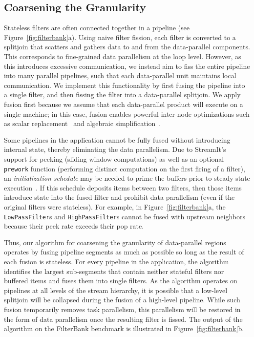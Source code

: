 \subsection{Coarsening the Granularity}

Stateless filters are often connected together in a pipeline (see
Figure~\ref{fig:filterbank}a).  Using naive filter fission, each
filter is converted to a splitjoin that scatters and gathers data to
and from the data-parallel components.  This corresponds to
fine-grained data parallelism at the loop level.  However, as this
introduces excessive communication, we instead aim to fiss the entire
pipeline into many parallel pipelines, such that each data-parallel
unit maintains local communication.  We implement this functionality
by first fusing the pipeline into a single filter, and then fissing
the filter into a data-parallel splitjoin.  We apply fusion first
because we assume that each data-parallel product will execute on a
single machine; in this case, fusion enables powerful inter-node
optimizations such as scalar replacement~\cite{sermulins:lctes:2005}
and algebraic simplification~\cite{agrawal:cases:2005,lamb:pldi:2003}.

Some pipelines in the application cannot be fully fused without
introducing internal state, thereby eliminating the data parallelism.
Due to StreamIt's support for peeking (sliding window computations) as
well as an optional {\tt prework} function (performing distinct
computation on the first firing of a filter), an {\it initialization
schedule} may be needed to prime the buffers prior to steady-state
execution~\cite{karczma-thesis}.  If this schedule deposits items
between two filters, then those items introduce state into the fused
filter and prohibit data parallelism (even if the original filters
were stateless).  For example, in Figure~\ref{fig:filterbank}a, the
{\tt LowPassFilter}s and {\tt HighPassFilter}s cannot be fused with
upstream neighbors because their peek rate exceeds their pop rate.

Thus, our algorithm for coarsening the granularity of data-parallel
regions operates by fusing pipeline segments as much as possible so
long as the result of each fusion is stateless.  For every pipeline in
the application, the algorithm identifies the largest sub-segments
that contain neither stateful filters nor buffered items and fuses
them into single filters.  As the algorithm operates on pipelines at
all levels of the stream hierarchy, it is possible that a low-level
splitjoin will be collapsed during the fusion of a high-level
pipeline.  While such fusion temporarily removes task parallelism,
this parallelism will be restored in the form of data parallelism once
the resulting filter is fissed.  The output of the algorithm on the
FilterBank benchmark is illustrated in Figure~\ref{fig:filterbank}b.

